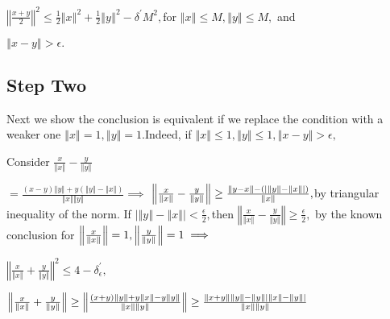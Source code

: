 \documentclass{article}
\begin{document}
$\left\Vert \frac{x+y}{2}\right\Vert ^{2}\leq \frac{1}{2}\left\Vert
x\right\Vert ^{2}+\frac{1}{2}\left\Vert y\right\Vert ^{2}-\delta ^{\prime
}M^{2},$for $\left\Vert x\right\Vert \leq M,\left\Vert y\right\Vert \leq M,$%
and

$\left\Vert x-y\right\Vert >\epsilon .$

\subsection{  Step Two}

\bigskip Next we show the conclusion is equivalent if we replace the
condition with a weaker one $\left\Vert x\right\Vert =1,\left\Vert
y\right\Vert =1.$Indeed, if $\left\Vert x\right\Vert \leq 1,\left\Vert
y\right\Vert \leq 1,\left\Vert x-y\right\Vert >\epsilon ,$

Consider $\frac{x}{\left\Vert x\right\Vert }-\frac{y}{\left\Vert
y\right\Vert }$

$=\frac{\left( x-y\right) \left\Vert y\right\Vert +y\left( \left\Vert
y\right\Vert -\left\Vert x\right\Vert \right) }{\left\Vert x\right\Vert
\left\Vert y\right\Vert }\implies $ $\left\Vert \frac{x}{\left\Vert
x\right\Vert }-\frac{y}{\left\Vert y\right\Vert }\right\Vert \geq \frac{%
\left\Vert y-x\right\Vert -\left( \left\vert \left\Vert y\right\Vert
-\left\Vert x\right\Vert \right\vert \right) }{\left\Vert x\right\Vert },$by
triangular inequality of the norm. If $\left\vert \left\Vert y\right\Vert
-\left\Vert x\right\Vert \right\vert <\frac{\epsilon }{2},$then $\left\Vert 
\frac{x}{\left\Vert x\right\Vert }-\frac{y}{\left\Vert y\right\Vert }%
\right\Vert \geq \frac{\epsilon }{2},$ by the known conclusion for $%
\left\Vert \frac{x}{\left\Vert x\right\Vert }\right\Vert =1,\left\Vert \frac{%
y}{\left\Vert y\right\Vert }\right\Vert =1\implies $

$\left\Vert \frac{x}{\left\Vert x\right\Vert }+\frac{y}{\left\Vert
y\right\Vert }\right\Vert ^{2}\leq 4-\delta _{\epsilon }^{\prime },$ 

$\left\Vert \frac{x}{\left\Vert x\right\Vert }+\frac{y}{\left\Vert
y\right\Vert }\right\Vert \geq \left\Vert \frac{\left( x+y\right) \left\Vert
y\right\Vert +y\left\Vert x\right\Vert -y\left\Vert y\right\Vert }{%
\left\Vert x\right\Vert \left\Vert y\right\Vert }\right\Vert \geq \frac{%
\left\Vert x+y\right\Vert \left\Vert y\right\Vert -\left\Vert y\right\Vert
\left\vert \left\Vert x\right\Vert -\left\Vert y\right\Vert \right\vert }{%
\left\Vert x\right\Vert \left\Vert y\right\Vert }$
\end{document}
